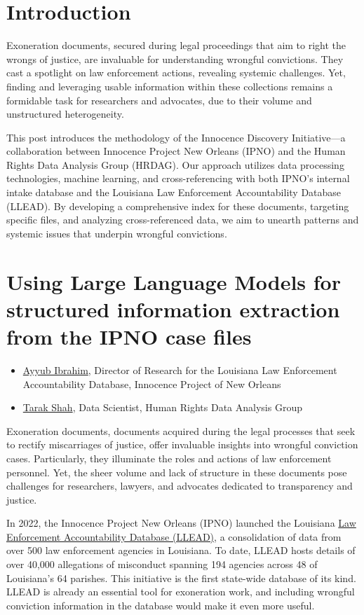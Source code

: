 \documentclass{article}
\begin{document}
\section{Introduction}
Exoneration documents, secured during legal proceedings that aim to right the wrongs of justice, are invaluable for understanding wrongful convictions. They cast a spotlight on law enforcement actions, revealing systemic challenges. Yet, finding and leveraging usable information within these collections remains a formidable task for researchers and advocates, due to their volume and unstructured heterogeneity.

This post introduces the methodology of the Innocence Discovery Initiative—a collaboration between Innocence Project New Orleans (IPNO) and the Human Rights Data Analysis Group (HRDAG). Our approach utilizes data processing technologies, machine learning, and cross-referencing with both IPNO's internal intake database and the Louisiana Law Enforcement Accountability Database (LLEAD). By developing a comprehensive index for these documents, targeting specific files, and analyzing cross-referenced data, we aim to unearth patterns and systemic issues that underpin wrongful convictions.

\section{Using Large Language Models for structured information extraction from the IPNO case files}
\begin{itemize}
    \item \href{https://ip-no.org/who-we-are/staff/#ai}{Ayyub Ibrahim}, Director of Research for the Louisiana Law Enforcement Accountability Database, Innocence Project of New Orleans
    \item \href{https://hrdag.org/people/tarak-shah/}{Tarak Shah}, Data Scientist, Human Rights Data Analysis Group
\end{itemize}

Exoneration documents, documents acquired during the legal processes that seek to rectify miscarriages of justice, offer invaluable insights into wrongful conviction cases. Particularly, they illuminate the roles and actions of law enforcement personnel. Yet, the sheer volume and lack of structure in these documents pose challenges for researchers, lawyers, and advocates dedicated to transparency and justice.

In 2022, the Innocence Project New Orleans (IPNO) launched the Louisiana \href{https://llead.co/}{Law Enforcement Accountability Database (LLEAD)}, a consolidation of data from over 500 law enforcement agencies in Louisiana. To date, LLEAD hosts details of over 40,000 allegations of misconduct spanning 194 agencies across 48 of Louisiana's 64 parishes. This initiative is the first state-wide database of its kind. LLEAD is already an essential tool for exoneration work, and including wrongful conviction information in the database would make it even more useful.
\end{document}
